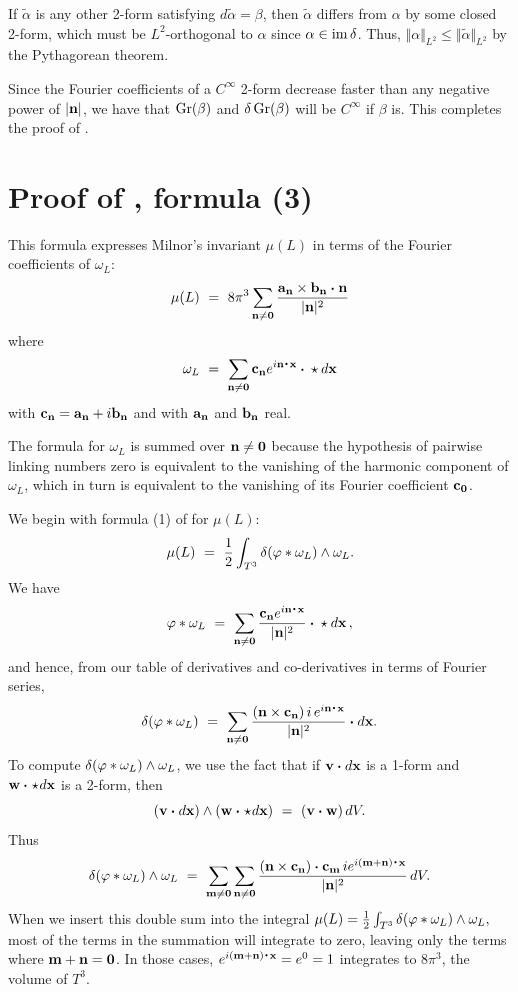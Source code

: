 If $\widetilde\alpha$ is any other 2-form satisfying $d\widetilde\alpha=\beta$, then $\widetilde\alpha$ differs from $\alpha$ by some closed 2-form, which must be $L^2$-orthogonal to $\alpha$ since $\alpha\in\mathrm{im\,}\delta$. Thus, $\Vert\alpha\Vert_{L^2}\le\Vert\widetilde\alpha\Vert_{L^2}$
by the Pythagorean theorem.

Since the Fourier coefficients of a $C^\infty$ 2-form decrease
faster than any negative power of $|\textup{\bf n}|$, we have that $\mathop{\rm Gr}\nolimits(\beta)$ and 
$\delta\mathop{\rm Gr}\nolimits(\beta)$ will be $C^\infty$ if $\beta$ is. This completes the proof
of .

\part{Proof of , formula (3)}

This formula expresses Milnor's invariant $\mu(L)$ in terms of the Fourier coefficients of $\omega_L$:
$$
\mu(L)\ = \ 8\pi^3\sum_{\n\ne\zero}\frac{\a_\n\times\b_\n\dtew\n}{\|\n\|^2}
$$
where 
$$
\omega_L\ = \ \sum_{\n\ne\zero}\c_\n e^{i\n\dte\x}\dtew \star d\x
$$
with $\textup{\bf c}_{\textup{\bf n}}=\textup{\bf a}_{\textup{\bf n}}+i\textup{\bf b}_{\textup{\bf n}}$ and with $\textup{\bf a}_{\textup{\bf n}}$ and $\textup{\bf b}_{\textup{\bf n}}$ real.

The formula for $\omega_L$ is summed over $\textup{\bf n}\ne{\bf0}$ because the hypothesis
of pairwise linking numbers zero is equivalent to the vanishing of the harmonic component of $\omega_L$, which in turn is equivalent to the vanishing of its Fourier coefficient $\textup{\bf c}_{\bf0}$.

We begin with formula (1) of  for $\mu(L)$:
$$
\mu(L)\ = \ {1\over 2}\int_{T^3}\delta(\varphi*\omega_L)\wedge\omega_L.
$$
We have
$$
\ph*\omega_L\ = \ \sum_{\n\ne\zero}\frac{\c_\n e^{i\n\dte\x}}{\|\n\|^2}\dtew \star d\x\,,
$$
and hence, from our table of derivatives and co-derivatives in terms of Fourier
series,
$$
\delta(\ph*\omega_L)\ = \ \sum_{\n\ne\zero} \frac{(\n\times\c_\n)\,i\,e^{i\n\dte\x}}{\|\n\|^2}\dtew d\x.
$$
To compute $\delta(\varphi*\omega_L)\wedge\omega_L$, we use the fact that if $\vv \dtew d\x$ is a 1-form and $\w\dtew \! \star \!d\x$ is a 2-form, then
$$
(\vv\dtew d\x)\wedge(\w\dtew \! \star\!d\x)\ = \ (\vv\dtew \w)\,dV.
$$
Thus
$$
\delta(\ph*\omega_L)\wedge\omega_L\ = \ \sum_{\m\ne\zero}\sum_{\n\ne\zero}
\frac{(\n\times\c_\n)\dtew\c_\m\,ie^{i(\m+\n)\dte\x}}{\|\n\|^2}\,dV.
$$
When we insert this double sum into the integral 
$\mu(L)={1\over 2}\int_{T^3}\delta(\varphi*\omega_L)\wedge\omega_L,$
most of the terms in the summation will integrate to zero, leaving only the terms
where $\textup{\bf m}+\textup{\bf n}={\bf0}$. In those cases, $e^{i(\m+\n)\dte\x}=e^0=1$ integrates
to $8\pi^3$, the volume of $T^3$.


